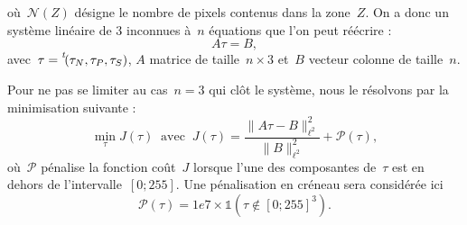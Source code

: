 \documentclass[main.tex]{subfiles}
\begin{document}
où~$\mathcal{N}(Z)$ désigne le nombre de pixels contenus dans la zone~$Z$. On a donc un système linéaire de 3 inconnues à~$n$ équations que l'on peut réécrire :
\begin{equation} \label{eq:Atau_egal_B}
A\tau=B,
\end{equation}
avec~$\tau= \prescript{\mathit{t\!}}{}{(}\tau_N,\tau_P,\tau_S)$, $A$ matrice de taille~$n\times 3$ et~$B$ vecteur colonne de taille~$n$.

Pour ne pas se limiter au cas~$n=3$ qui clôt le système, nous le résolvons par la minimisation suivante :
\begin{equation}\label{eq:min_optim_grey}
\min_{\tau} J(\tau) \ \textrm{ avec } \ J(\tau)= \dfrac{\| A\tau - B \|^2_{\ell^2}}{\|B\|^2_{\ell^2}} + \mathcal{P}(\tau),
\end{equation}
où~$\mathcal{P}$ pénalise la fonction coût~$J$ lorsque l'une des composantes de~$\tau$ est en dehors de l'intervalle~$[0;255]$. 
Une pénalisation en créneau sera considérée ici
\begin{equation}
\label{eq:penalisation_creneau}
\mathcal{P}(\tau) = 1e7 \times\mathds{1}( \tau \notin  [0;255]^3 ).
\end{equation}
\end{document}
